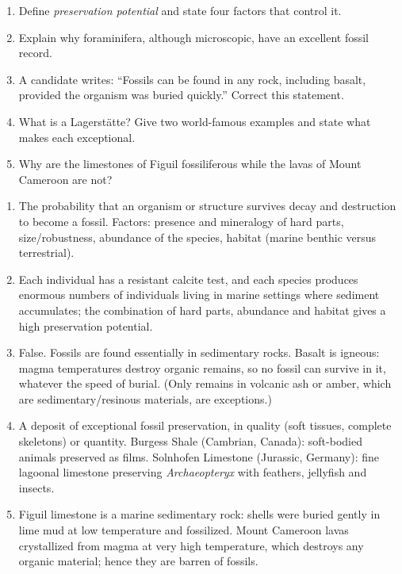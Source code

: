 \documentclass[11pt]{article}
\begin{document}
\begin{exercice}
\begin{enumerate}
\item Define \emph{preservation potential} and state four factors that control it.
\item Explain why foraminifera, although microscopic, have an excellent fossil record.
\item A candidate writes: ``Fossils can be found in any rock, including basalt, provided the organism was buried quickly.'' Correct this statement.
\item What is a Lagerstätte? Give two world-famous examples and state what makes each exceptional.
\item Why are the limestones of Figuil fossiliferous while the lavas of Mount Cameroon are not?
\end{enumerate}
\end{exercice}

\begin{corrige}[Exercise 7]
\begin{enumerate}
\item The probability that an organism or structure survives decay and destruction to become a fossil. Factors: presence and mineralogy of hard parts, size/robustness, abundance of the species, habitat (marine benthic versus terrestrial).
\item Each individual has a resistant calcite test, and each species produces enormous numbers of individuals living in marine settings where sediment accumulates; the combination of hard parts, abundance and habitat gives a high preservation potential.
\item False. Fossils are found essentially in sedimentary rocks. Basalt is igneous: magma temperatures destroy organic remains, so no fossil can survive in it, whatever the speed of burial. (Only remains in volcanic ash or amber, which are sedimentary/resinous materials, are exceptions.)
\item A deposit of exceptional fossil preservation, in quality (soft tissues, complete skeletons) or quantity. Burgess Shale (Cambrian, Canada): soft-bodied animals preserved as films. Solnhofen Limestone (Jurassic, Germany): fine lagoonal limestone preserving \emph{Archaeopteryx} with feathers, jellyfish and insects.
\item Figuil limestone is a marine sedimentary rock: shells were buried gently in lime mud at low temperature and fossilized. Mount Cameroon lavas crystallized from magma at very high temperature, which destroys any organic material; hence they are barren of fossils.
\end{enumerate}
\end{corrige}
\end{document}
